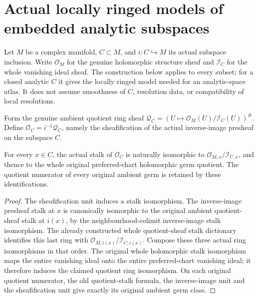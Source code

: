 \section{Actual locally ringed models of embedded analytic subspaces}
\label{sec:hironaka-actual-analytic-subspace}

Let $M$ be a complex manifold, $C\subset M$, and $i:C\hookrightarrow M$
its actual subspace inclusion. Write $\mathcal O_M$ for the genuine
holomorphic structure sheaf and $\mathcal I_C$ for the whole vanishing
ideal sheaf. The construction below applies to every subset; for a closed
analytic $C$ it gives the locally ringed model needed for an analytic-space
atlas. It does not assume smoothness of $C$, resolution data, or compatibility
of local resolutions.

\begin{definition}
\label{hir:actual-analytic-subspace-structure-sheaf}
\leanok
Form the genuine ambient quotient ring sheaf
$\mathcal Q_C=(U\mapsto\mathcal O_M(U)/\mathcal I_C(U))^\#$.
Define $\mathcal O_C=i^{-1}\mathcal Q_C$, namely the sheafification of
the actual inverse-image presheaf on the subspace $C$.
\end{definition}

\begin{theorem}
\label{hir:actual-analytic-subspace-whole-stalk}
\leanok
For every $x\in C$, the actual stalk of $\mathcal O_C$ is naturally isomorphic
to $\mathcal O_{M,x}/\mathcal I_{C,x}$, and thence to the whole original
preferred-chart holomorphic germ quotient. The quotient numerator of every
original ambient germ is retained by these identifications.
\end{theorem}
\begin{proof}
The sheafification unit induces a stalk isomorphism. The inverse-image
presheaf stalk at $x$ is canonically isomorphic to the original ambient
quotient-sheaf stalk at $i(x)$, by the neighbourhood-colimit inverse-image
stalk isomorphism. The already constructed whole quotient-sheaf stalk
dictionary identifies this last ring with
$\mathcal O_{M,i(x)}/\mathcal I_{C,i(x)}$.
Compose these three actual ring isomorphisms in that order. The original
whole holomorphic stalk isomorphism maps the entire vanishing ideal onto
the entire preferred-chart vanishing ideal; it therefore induces the
claimed quotient ring isomorphism. On each original quotient numerator,
the old quotient-stalk formula, the inverse-image unit and the
sheafification unit give exactly its original ambient germ class.
\end{proof}

